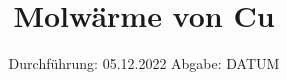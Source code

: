 

\subject{V 47}
\title{Molwärme von Cu}
\date{%
  Durchführung: 05.12.2022
  \hspace{3em}
  Abgabe: DATUM
}



\maketitle
\thispagestyle{empty}
\tableofcontents
\newpage




%



\printbibliography{}


